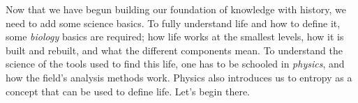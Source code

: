 Now that we have begun building our foundation of knowledge with history, we need to add some science basics.
To fully understand life and how to define it, some \emph{biology} basics are required; how life works at the smallest levels, how it is built and rebuilt, and what the different components mean.
To understand the science of the tools used to find this life, one has to be schooled in \emph{physics}, and how the field's analysis methods work.
Physics also introduces us to entropy as a concept that can be used to define life.
Let's begin there.